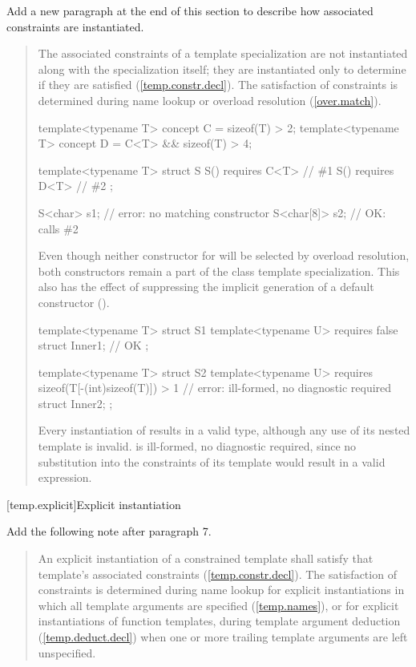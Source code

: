 Add a new paragraph at the end of this section to describe how associated
constraints are instantiated.

\begin{quote}
\begin{addedblock}
\setcounter{Paras}{15}
\pnum
The associated constraints of a template specialization are not
instantiated along with the specialization itself; they are
instantiated only to determine if they are satisfied
(\ref{temp.constr.decl}).
% 
\enternote
The satisfaction of constraints is determined during name lookup or overload
resolution (\ref{over.match}).
\exitnote
% 
\enterexample
\begin{codeblock}
template<typename T> concept C = sizeof(T) > 2;
template<typename T> concept D = C<T> && sizeof(T) > 4;

template<typename T> struct S {
  S() requires C<T> { } // \#1
  S() requires D<T> { } // \#2
};

S<char> s1;    // error: no matching constructor
S<char[8]> s2; // OK: calls \#2
\end{codeblock}

Even though neither constructor for  will be selected by
overload resolution, both constructors remain a part of the class template 
specialization. 
% 
This also has the effect of suppressing the implicit generation of a default
constructor ().
\exitexample
% 
\enterexample
\begin{codeblock}
template<typename T> struct S1 {
  template<typename U> requires false struct Inner1; // OK
};

template<typename T> struct S2 {
  template<typename U> 
    requires sizeof(T[-(int)sizeof(T)]) > 1 // error: ill-formed, no diagnostic required
      struct Inner2;
};
\end{codeblock}
\exitexample
Every instantiation of  results in a valid type, although any use 
of its nested  template is invalid.
% 
 is ill-formed, no diagnostic required, since no substitution into 
the constraints of its  template would result in a valid 
expression.
\end{addedblock}
\end{quote}


[temp.explicit]{Explicit instantiation}

Add the following note after paragraph 7.

\begin{quote}
\setcounter{Paras}{7}
\begin{addedblock}
\pnum
\enternote
An explicit instantiation of a constrained template shall satisfy that
template's associated constraints (\ref{temp.constr.decl}). The satisfaction
of constraints is determined during name lookup for explicit instantiations
in which all template arguments are specified (\ref{temp.names}), or for
explicit instantiations of function templates, during template argument 
deduction (\ref{temp.deduct.decl}) when one or more trailing template 
arguments are left unspecified.
\exitnote
\end{addedblock}
\end{quote}

